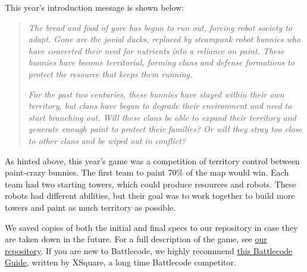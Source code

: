   This year's introduction message is shown below:

  \begin{quote}
    \textit{The bread and food of yore has begun to run out, forcing robot society to adapt. Gone are the jovial ducks, replaced by steampunk robot bunnies who have converted their need for nutrients into a reliance on paint. These bunnies have become territorial, forming clans and defense formations to protect the resource that keeps them running.}
    
    \medskip
    
    \textit{For the past two centuries, these bunnies have stayed within their own territory, but clans have begun to degrade their environment and need to start branching out. Will these clans be able to expand their territory and generate enough paint to protect their families? Or will they stray too close to other clans and be wiped out in conflict?}
  \end{quote}

  As hinted above, this year's game was a competition of territory control between paint-crazy bunnies. The first team to paint 70\% of the map would win. Each team had two starting towers, which could produce resources and robots. These robots had different abilities, but their goal was to work together to build more towers and paint as much territory as possible.

  \medskip

  We saved copies of both the initial and final specs to our repository in case they are taken down in the future. For a full description of the game, see \href{https://github.com/justinottesen/battlecode25}{our repository}. If you are new to Battlecode, we highly recommend \href{https://battlecode.org/assets/files/battlecode-guide-xsquare.pdf}{this Battlecode Guide}, written by XSquare, a long time Battlecode competitor.